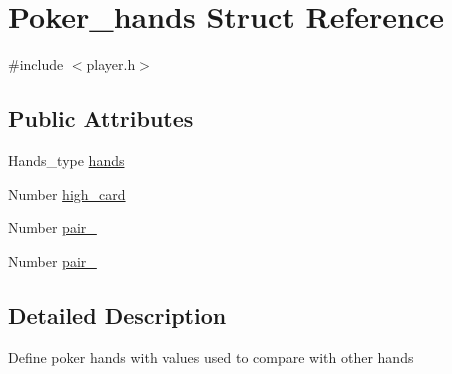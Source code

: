 \hypertarget{structPoker__hands}{\section{Poker\+\_\+hands Struct Reference}
\label{structPoker__hands}
}


{\ttfamily \#include $<$player.\+h$>$}

\subsection*{Public Attributes}
\begin{DoxyCompactItemize}
\item 
Hands\+\_\+type \hyperlink{structPoker__hands_a7b36a51226eea12e0860c901a770820f}{hands}
\item 
Number \hyperlink{structPoker__hands_a5e69528aafb7fd7a71ad83d7a7f03456}{high\+\_\+card}
\item 
Number \hyperlink{structPoker__hands_ad0638d6685ba9b386f479f14c47c0790}{pair\+\_}
\item 
Number \hyperlink{structPoker__hands_aaa7790b1295984b266b3609a2f582bb8}{pair\+\_}
\end{DoxyCompactItemize}


\subsection{Detailed Description}
Define poker hands with values used to compare with other hands 


